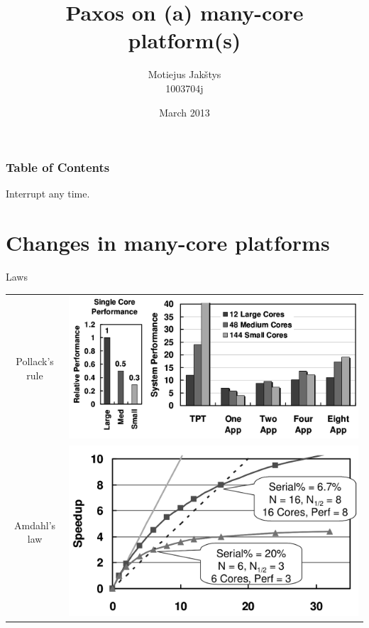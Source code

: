 \documentclass[14pt]{beamer}
\title{Paxos on (a) many-core platform(s)}
\author{Motiejus Jak\v{s}tys \\
1003704j}
\date{March 2013}
\begin{document}
\begin{frame}[plain]
    \titlepage
\end{frame}

\begin{frame}
    \frametitle{Table of Contents}
    \tableofcontents
    Interrupt any time.
\end{frame}

\section{Changes in many-core platforms}

\begin{frame}{Laws}
    \begin{tabular}{cm{0cm}}
            Pollack's rule &
            \pause
            \includegraphics[height=0.4\textheight]{images/pollack.png}
            \\
            Amdahl's law &
            \pause
            \includegraphics[height=0.4\textheight]{images/amdahl.png} \\
    \end{tabular}
\end{frame}
\end{document}
